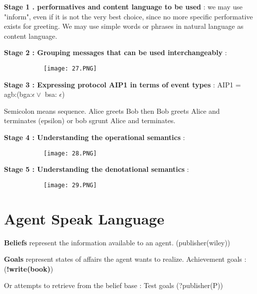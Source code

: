 \documentclass{article}
\begin{document}
\textbf{Stage 1 . performatives and content language to be used} : we may use "inform", even if it is not the very best choice, since no more specific performative exists for greeting. We may use simple words or phrases in natural language as content language.

\textbf{Stage 2 : Grouping messages that can be used interchangeably} :

\begin{figure}[ht!]
  \centering
  \begin{subfigure}[b]{0.5\linewidth}
    \texttt{[image: 27.PNG]}
  \end{subfigure}
\end{figure}

\textbf{Stage 3 : Expressing protocol AIP1 in terms of event types} : AIP1 = agb:(bga:$\epsilon \lor$ bsa: $\epsilon$)

Semicolon means sequence. Alice greets Bob then Bob greets Alice and terminates (epsilon) or bob sgrunt Alice and terminates.

\textbf{Stage 4 : Understanding the operational semantics} : 

\begin{figure}[ht!]
  \centering
  \begin{subfigure}[b]{0.5\linewidth}
    \texttt{[image: 28.PNG]}
  \end{subfigure}
\end{figure}

\textbf{Stage 5 : Understanding the denotational semantics} :

\begin{figure}[ht!]
  \centering
  \begin{subfigure}[b]{0.5\linewidth}
    \texttt{[image: 29.PNG]}
  \end{subfigure}
\end{figure}

\section{Agent Speak Language}

\textbf{Beliefs} represent the information available to an agent. (publisher(wiley))

\textbf{Goals} represent states of affairs the agent wants to realize. Achievement goals : (\textbf{!write(book)})

Or attempts to retrieve from the belief base : Test goals (?publisher(P))
\end{document}
